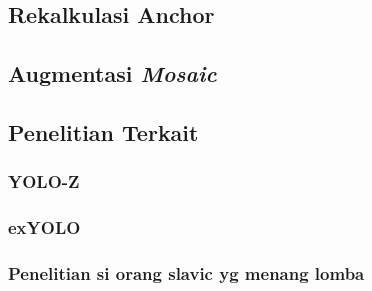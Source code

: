 \subsection{Rekalkulasi Anchor}
  \lipsum[1]
\subsection{Augmentasi \emph{Mosaic}}
  \lipsum[1]

\subsection{Penelitian Terkait}
  \subsubsection{YOLO-Z}
    \lipsum[2]
  \subsubsection{exYOLO}
    \lipsum[2]
  \subsubsection{Penelitian si orang slavic yg menang lomba}
    \lipsum[2]